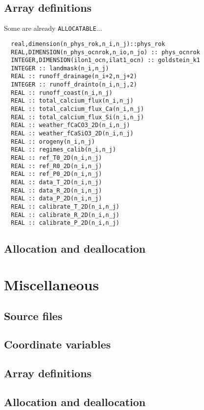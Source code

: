 \documentclass[a4paper,10pt,article]{memoir}
\begin{document}
\section{Array definitions}

Some are already \texttt{ALLOCATABLE}...

\begin{verbatim}
  real,dimension(n_phys_rok,n_i,n_j)::phys_rok
  REAL,DIMENSION(n_phys_ocnrok,n_io,n_jo) :: phys_ocnrok
  INTEGER,DIMENSION(ilon1_ocn,ilat1_ocn) :: goldstein_k1
  INTEGER :: landmask(n_i,n_j)
  REAL :: runoff_drainage(n_i+2,n_j+2)
  INTEGER :: runoff_drainto(n_i,n_j,2)
  REAL :: runoff_coast(n_i,n_j)
  REAL :: total_calcium_flux(n_i,n_j)
  REAL :: total_calcium_flux_Ca(n_i,n_j)
  REAL :: total_calcium_flux_Si(n_i,n_j)
  REAL :: weather_fCaCO3_2D(n_i,n_j)
  REAL :: weather_fCaSiO3_2D(n_i,n_j)
  REAL :: orogeny(n_i,n_j)
  REAL :: regimes_calib(n_i,n_j)
  REAL :: ref_T0_2D(n_i,n_j)
  REAL :: ref_R0_2D(n_i,n_j)
  REAL :: ref_P0_2D(n_i,n_j)
  REAL :: data_T_2D(n_i,n_j)
  REAL :: data_R_2D(n_i,n_j)
  REAL :: data_P_2D(n_i,n_j)
  REAL :: calibrate_T_2D(n_i,n_j)
  REAL :: calibrate_R_2D(n_i,n_j)
  REAL :: calibrate_P_2D(n_i,n_j)
\end{verbatim}

\section{Allocation and deallocation}


\chapter{Miscellaneous}

\section{Source files}

\section{Coordinate variables}

\section{Array definitions}

\section{Allocation and deallocation}
\end{document}
